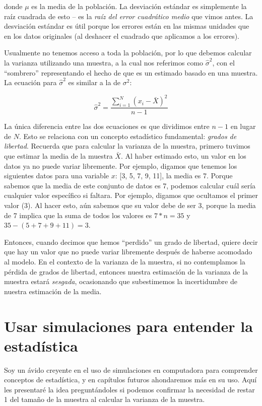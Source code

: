 \documentclass[
  12pt,
]{book}
\begin{document}
donde \(\mu\) es la media de la población. La desviación estándar es simplemente la raíz cuadrada de esto -- es la \emph{raíz del error cuadrático medio} que vimos antes. La desviación estándar es útil porque los errores están en las mismas unidades que en los datos originales (al deshacer el cuadrado que aplicamos a los errores).

Usualmente no tenemos acceso a toda la población, por lo que debemos calcular la varianza utilizando una muestra, a la cual nos referimos como \(\hat{\sigma}^2\), con el ``sombrero'' representando el hecho de que es un estimado basado en una muestra. La ecuación para \(\hat{\sigma}^2\) es similar a la de \(\sigma^2\):

\[
\hat{\sigma}^2 = \frac{\sum_{i=1}^N (x_i - \bar{X})^2}{n-1}
\]

La única diferencia entre las dos ecuaciones es que dividimos entre \(n - 1\) en lugar de \(N\). Esto se relaciona con un concepto estadístico fundamental: \emph{grados de libertad}. Recuerda que para calcular la varianza de la muestra, primero tuvimos que estimar la media de la muestra \(\bar{X}\). Al haber estimado esto, un valor en los datos ya no puede variar libremente. Por ejemplo, digamos que tenemos los siguientes datos para una variable \(x\): {[}3, 5, 7, 9, 11{]}, la media es 7. Porque sabemos que la media de este conjunto de datos es 7, podemos calcular cuál sería cualquier valor específico si faltara. Por ejemplo, digamos que ocultamos el primer valor (3). Al hacer esto, aún sabemos que su valor debe de ser 3, porque la media de 7 implica que la suma de todos los valores es \(7 * n = 35\) y \(35 - (5 + 7 + 9 + 11) = 3\).

Entonces, cuando decimos que hemos ``perdido'' un grado de libertad, quiere decir que hay un valor que no puede variar libremente después de haberse acomodado al modelo. En el contexto de la varianza de la muestra, si no contemplamos la pérdida de grados de libertad, entonces nuestra estimación de la varianza de la muestra estará \emph{sesgada}, ocasionando que subestimemos la incertidumbre de nuestra estimación de la media.

\hypertarget{usar-simulaciones-para-entender-la-estaduxedstica}{%
\section{Usar simulaciones para entender la estadística}\label{usar-simulaciones-para-entender-la-estaduxedstica}}

Soy un ávido creyente en el uso de simulaciones en computadora para comprender conceptos de estadística, y en capítulos futuros ahondaremos más en su uso. Aquí les presentaré la idea preguntándoles si podemos confirmar la necesidad de restar 1 del tamaño de la muestra al calcular la varianza de la muestra.
\end{document}
